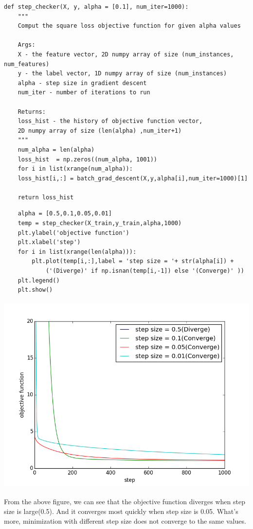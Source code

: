 \documentclass{article}
\begin{document}
\begin{verbatim}
def step_checker(X, y, alpha = [0.1], num_iter=1000):
	"""
	Comput the square loss objective function for given alpha values
	
	Args:
	X - the feature vector, 2D numpy array of size (num_instances, num_features)
	y - the label vector, 1D numpy array of size (num_instances)
	alpha - step size in gradient descent
	num_iter - number of iterations to run 
	
	Returns:
	loss_hist - the history of objective function vector, 
	2D numpy array of size (len(alpha) ,num_iter+1) 
	"""
	num_alpha = len(alpha)
	loss_hist  = np.zeros((num_alpha, 1001))
	for i in list(xrange(num_alpha)):
	loss_hist[i,:] = batch_grad_descent(X,y,alpha[i],num_iter=1000)[1]
	
	return loss_hist
\end{verbatim}

\begin{verbatim}
    alpha = [0.5,0.1,0.05,0.01] 
    temp = step_checker(X_train,y_train,alpha,1000)
    plt.ylabel('objective function')
    plt.xlabel('step')
    for i in list(xrange(len(alpha))):
	    plt.plot(temp[i,:],label = 'step size = '+ str(alpha[i]) + 
		    ('(Diverge)' if np.isnan(temp[i,-1]) else '(Converge)' ))   
    plt.legend()
    plt.show()
\end{verbatim}
\begin{center}
	 \includegraphics[height = 4in]{2_4_2.png}
\end{center}

From the above figure, we can see that the objective function diverges when step size is large(0.5). And it converges most quickly when step size is 0.05. What's more, minimization with different step size does not converge to the same values. 
\end{document}
